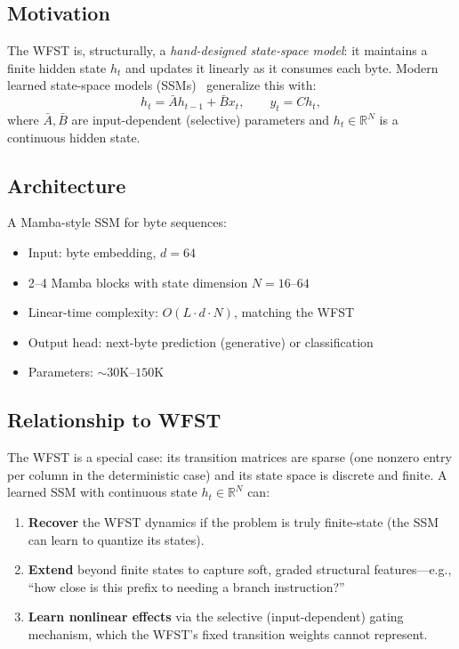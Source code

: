 \documentclass{article}
\begin{document}
\subsection{Motivation}

The WFST is, structurally, a \emph{hand-designed state-space model}:
it maintains a finite hidden state $h_t$ and updates it linearly as it
consumes each byte.  Modern learned state-space models
(SSMs)~\cite{gu2024mamba} generalize this with:
\begin{equation}
  h_t = \bar{A} h_{t-1} + \bar{B} x_t, \qquad
  y_t = C h_t,
\end{equation}
where $\bar{A}, \bar{B}$ are input-dependent (selective) parameters
and $h_t \in \mathbb{R}^N$ is a continuous hidden state.

\subsection{Architecture}

A Mamba-style SSM for byte sequences:
\begin{itemize}
  \item Input: byte embedding, $d=64$
  \item 2--4 Mamba blocks with state dimension $N=16$--$64$
  \item Linear-time complexity: $O(L \cdot d \cdot N)$, matching the WFST
  \item Output head: next-byte prediction (generative) or classification
  \item Parameters: ${\sim}30$K--$150$K
\end{itemize}

\subsection{Relationship to WFST}

The WFST is a special case: its transition matrices are sparse (one nonzero
entry per column in the deterministic case) and its state space is discrete
and finite.  A learned SSM with continuous state $h_t \in \mathbb{R}^N$
can:
\begin{enumerate}
  \item \textbf{Recover} the WFST dynamics if the problem is truly
        finite-state (the SSM can learn to quantize its states).
  \item \textbf{Extend} beyond finite states to capture soft, graded
        structural features---e.g., ``how close is this prefix to needing
        a branch instruction?''
  \item \textbf{Learn nonlinear effects} via the selective (input-dependent)
        gating mechanism, which the WFST's fixed transition weights cannot
        represent.
\end{enumerate}
\end{document}
